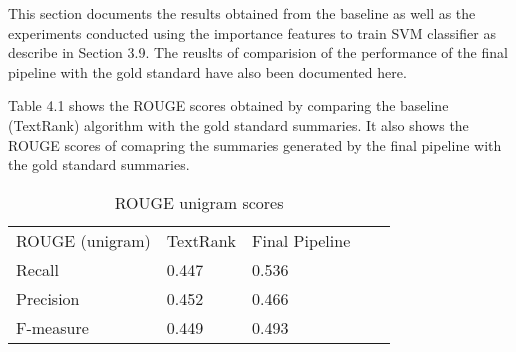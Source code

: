 This section documents the results obtained from the baseline as well as the experiments conducted using the importance features to train SVM classifier as describe in Section 3.9.
The reuslts of comparision of the performance of the final pipeline with the gold standard have also been documented here.

Table 4.1 shows the ROUGE scores obtained by comparing the baseline (TextRank) algorithm with the gold standard summaries.
It also shows the ROUGE scores of comapring the summaries generated by the final pipeline with the gold standard summaries.

\begin{table}[h]
\caption{ROUGE unigram scores}
\begin{tabular}{|l|l|l|ll}
\cline{1-3}
ROUGE (unigram) & TextRank & Final Pipeline &  &  \\ \cline{1-3}
Recall          & 0.447    & 0.536          &  &  \\ \cline{1-3}
Precision       & 0.452    & 0.466          &  &  \\ \cline{1-3}
F-measure       & 0.449    & 0.493          &  &  \\ \cline{1-3}
\end{tabular}
\end{table}